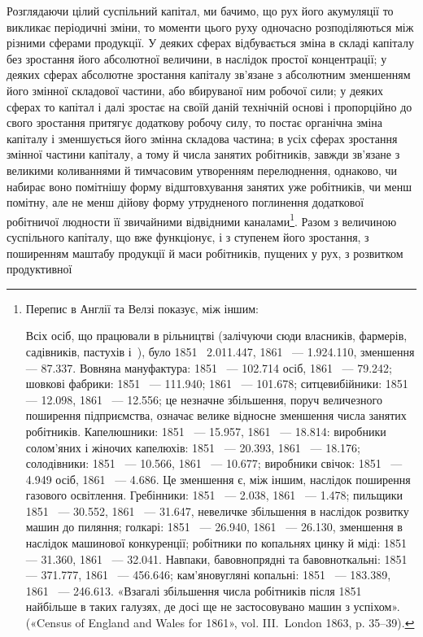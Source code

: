 Розглядаючи цілий суспільний капітал, ми бачимо, що рух
його акумуляції то викликає періодичні зміни, то моменти цього
руху одночасно розподіляються між різними сферами продукції.
У деяких сферах відбувається зміна в складі капіталу без зростання
його абсолютної величини, в наслідок простої концентрації;
у деяких сферах абсолютне зростання капіталу зв’язане з абсолютним
зменшенням його змінної складової частини, або вбируваної
ним робочої сили; у деяких сферах то капітал і далі зростає
на своїй даній технічній основі і пропорційно до свого зростання
притягує додаткову робочу силу, то постає органічна зміна капіталу
і зменшується його змінна складова частина; в усіх сферах
зростання змінної частини капіталу, а тому й числа занятих
робітників, завжди зв’язане з великими коливаннями й тимчасовим
утворенням перелюднення, однаково, чи набирає воно
помітнішу форму відштовхування занятих уже робітників, чи
менш помітну, але не менш дійову форму утрудненого поглинення
додаткової робітничої людности її звичайними відвідними каналами\footnote{
Перепис в Англії та Велзі показує, між іншим:

Всіх осіб, що працювали в рільництві (залічуючи сюди власників,
фармерів, садівників, пастухів і~), було 1851~ \num{2.011.447}, 1861~ —
\num{1.924.110}, зменшення — \num{87.337}. Вовняна мануфактура: 1851~ — \num{102.714}
осіб, 1861~ — \num{79.242}; шовкові фабрики: 1851~ — \num{111.940}; 1861~ —
\num{101.678}; ситцевибійники: 1851~ — \num{12.098}, 1861~ — \num{12.556}; це незначне
збільшення, поруч величезного поширення підприємства, означає
велике відносне зменшення числа занятих робітників. Капелюшники:
1851~ — \num{15.957}, 1861~ — \num{18.814}: виробники солом’яних і жіночих капелюхів:
1851~ — \num{20.393}, 1861~ — \num{18.176}; солодівники: 1851~ —
\num{10.566}, 1861~ — \num{10.677}; виробники свічок: 1851~ — \num{4.949} осіб, 1861~ —
\num{4.686}. Це зменшення є, між іншим, наслідок поширення газового освітлення.
Гребінники: 1851~ — \num{2.038}, 1861~ — \num{1.478}; пильщики 1851~ —
\num{30.552}, 1861~ — \num{31.647}, невеличке збільшення в наслідок розвитку
машин до пиляння; голкарі: 1851~ — \num{26.940}, 1861~ — \num{26.130}, зменшення
в наслідок машинової конкуренції; робітники по копальнях цинку й
міді: 1851~ — \num{31.360}, 1861~ — \num{32.041}. Навпаки, бавовнопрядні та бавовноткальні:
1851~ — \num{371.777}, 1861~ — \num{456.646}; кам’яновугляні копальні:
1851~ — \num{183.389}, 1861~ — \num{246.613}. «Взагалі збільшення числа робітників
після 1851~ найбільше в таких галузях, де досі ще не застосовувано
машин з успіхом». («Census of England and Wales for 1861», vol. III.~London 1863, p. 35--39).
}.
Разом з величиною суспільного капіталу, що вже функціонує,
і з ступенем його зростання, з поширенням маштабу
продукції й маси робітників, пущених у рух, з розвитком продуктивної
\parbreak{}  %
